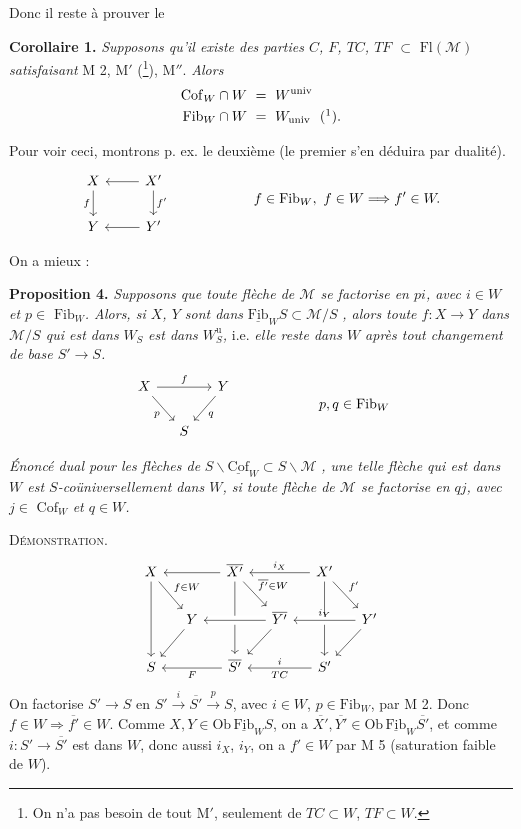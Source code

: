 \documentclass[11pt]{article}
\newcommand{\printedpage}[1]{\marginpar{\footnotesize p.~#1}}
\newcommand{\msp}[1]{\marginpar{\footnotesize [#1]}}
\newcommand{\Fl}{\mathrm{Fl}}
\newcommand{\cM}{\mathcal{M}}
\newcommand{\Cof}{\mathrm{Cof}}
\newcommand{\Fib}{\mathrm{Fib}}
\newcommand{\Ob}{\mathrm{Ob}}
\begin{document}
\msp{page 10}Donc il reste à prouver le

\textbf{Corollaire 1.} \textit{Supposons qu'il existe des parties $C$, $F$, $TC$, $TF$ $\subset$} $\Fl(\cM)$ \textit{satisfaisant} M 2, M$'$ (\footnote{On n'a pas besoin de tout M$'$, seulement de $TC\subset W$, $TF\subset W$.}), M$''$. \textit{Alors}
\[
\begin{aligned}
\Cof_W\cap W\ &=\ W^{\mathrm{univ}}\\
\Fib_W\cap W\ &=\ W_{\mathrm{univ}}\ \ (\mbox{\footnotemark}).
\end{aligned}
\]

Pour voir ceci, montrons p. ex. le deuxième (le premier s'en déduira par dualité).
\[
\begin{tikzcd}
X \ar[d,"f"'] & X' \ar[l] \ar[d,"f'"] \\
Y & Y' \ar[l]
\end{tikzcd}
\qquad\qquad\qquad
f\in\Fib_W,\ f\in W\Longrightarrow f'\in W.
\]

\printedpage{7}
On a mieux :

\textbf{Proposition 4.} \textit{Supposons que toute flèche de $\cM$ se factorise en $pi$, avec $i\in W$ et $p\in$} $\Fib_W$\textit{. Alors, si $X$, $Y$ sont dans} $\underline{\Fib}_W S\subset\cM/S$ \textit{, alors toute $f:X\longrightarrow Y$ dans $\cM/S$ qui est dans} $W_S$ \textit{est dans $W^{\mathrm{u}}_S$,} i.e. \textit{elle reste dans $W$ après tout changement de base $S'\longrightarrow S$.}
\[
\begin{tikzcd}[column sep=small]
X \ar[rr,"f"] \ar[dr,"p"'] & & Y \ar[dl,"q"] \\
& S &
\end{tikzcd}
\qquad\qquad\qquad
p,q\in\Fib_W
\]

\textit{Énoncé dual pour les flèches de} $S\backslash\underline{\Cof}_W\subset S\backslash\cM$ \textit{, une telle flèche qui est dans $W$ est $S$-coüniversellement dans $W$, si toute flèche de $\cM$ se factorise en $qj$, avec $j\in$} $\Cof_W$ \textit{et $q\in W$.}

\msp{page 11}\textsc{Démonstration}.
\[
\begin{tikzcd}[column sep=small]
X \ar[dr,"f\in W"] \ar[dd] & & \overline{X'} \ar[ll] \ar[dr,"\overline{f'}\in W"] \ar[dd] & & X' \ar[ll,"i_X"'] \ar[dr,"f'"] \ar[dd] & \\
& Y \ar[dl] & & \overline{Y'} \ar[ll,crossing over] \ar[dl] & & Y' \ar[ll,"i_Y"',crossing over] \ar[dl] \\
S & & \overline{S'} \ar[ll,"F"] & & S' \ar[ll,"i"',"TC"] &
\end{tikzcd}
\]
On factorise $S'\longrightarrow S$ en $S'\overset{i}{\longrightarrow}\overline{S'}\overset{p}{\longrightarrow}S$, avec $i\in W$, $p\in\Fib_W$, par M 2. Donc $f\in W\Longrightarrow\overline{f'}\in W$. Comme $X,Y\in\Ob\,\underline{\Fib}_W S$, on a $\overline{X'},\overline{Y'}\in\Ob\,\underline{\Fib}_W\overline{S'}$, et comme $i:S'\longrightarrow\overline{S'}$ est dans $W$, donc aussi $i_X$, $i_Y$, on a $f'\in W$ par M 5 (saturation faible de $W$).
\end{document}
